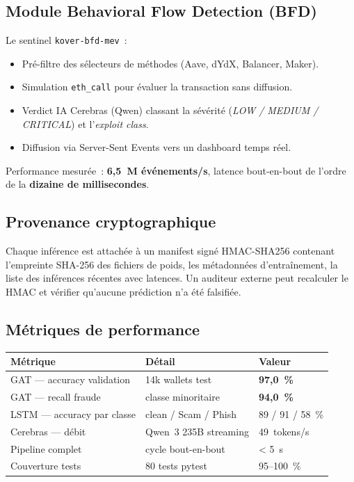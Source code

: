 \documentclass[11pt,a4paper]{article}
\begin{document}
\subsection{Module Behavioral Flow Detection (BFD)}

Le sentinel \texttt{kover-bfd-mev}~:

\begin{itemize}
  \item Pré-filtre des sélecteurs de méthodes (Aave, dYdX, Balancer,
        Maker).
  \item Simulation \texttt{eth\_call} pour évaluer la transaction sans
        diffusion.
  \item Verdict IA Cerebras (Qwen) classant la sévérité
        (\emph{LOW / MEDIUM / CRITICAL}) et l'\emph{exploit class}.
  \item Diffusion via Server-Sent Events vers un dashboard temps réel.
\end{itemize}

Performance mesurée~: \textbf{6,5~M événements/s}, latence bout-en-bout
de l'ordre de la \textbf{dizaine de millisecondes}.

\subsection{Provenance cryptographique}

Chaque inférence est attachée à un manifest signé HMAC-SHA256 contenant
l'empreinte SHA-256 des fichiers de poids, les métadonnées
d'entraînement, la liste des inférences récentes avec latences. Un
auditeur externe peut recalculer le HMAC et vérifier qu'aucune
prédiction n'a été falsifiée.

\subsection{Métriques de performance}

\begin{tabularx}{\linewidth}{@{}lXl@{}}
\toprule
\textbf{Métrique} & \textbf{Détail} & \textbf{Valeur} \\
\midrule
GAT --- accuracy validation & 14k wallets test & \textbf{97,0~\%} \\
GAT --- recall fraude & classe minoritaire & \textbf{94,0~\%} \\
LSTM --- accuracy par classe & clean / Scam / Phish & 89 / 91 / 58~\% \\
Cerebras --- débit & Qwen~3 235B streaming & 49~tokens/s \\
Pipeline complet & cycle bout-en-bout & < 5~s \\
Couverture tests & 80 tests pytest & 95--100~\% \\
\bottomrule
\end{tabularx}
\end{document}
